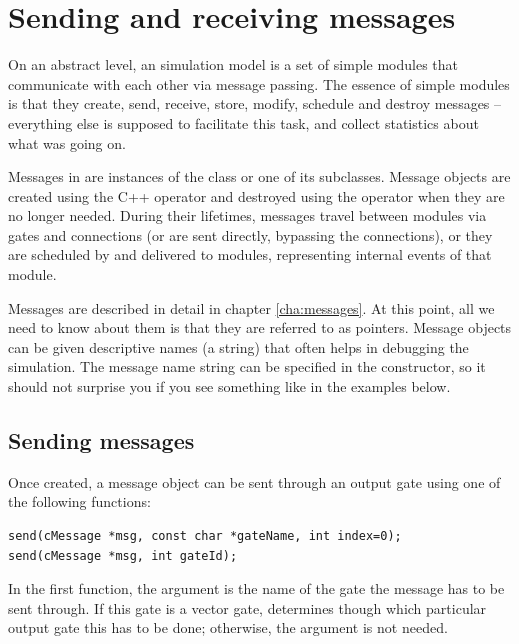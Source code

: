 \section{Sending and receiving messages}
\label{ch:simple-modules:sending-and-receiving}

On an abstract level, an {\opp} simulation model is a set of
simple modules that communicate with each other via message passing.
The essence of simple modules is that they create, send, receive,
store, modify, schedule and destroy messages -- everything else
is supposed to facilitate this task, and collect statistics
about what was going on.

Messages in {\opp} are instances of the  class or
one of its subclasses. Message objects are created using the C++
 operator and destroyed using the  operator
when they are no longer needed. During their lifetimes,
messages travel between modules via gates and connections
(or are sent directly, bypassing the connections), or
they are scheduled by and delivered to modules,
representing internal events of that module.

Messages are described in detail in chapter \ref{cha:messages}.
At this point, all we need to know about them is that they are
referred to as  pointers. Message objects
can be given descriptive names (a  string)
that often helps in debugging the simulation. The message
name string can be specified in the constructor, so it
should not surprise you if you see something like
 in the examples below.



\subsection{Sending messages}

Once created, a message object can be sent through an
output gate using one of the following functions:

\begin{verbatim}
send(cMessage *msg, const char *gateName, int index=0);
send(cMessage *msg, int gateId);
\end{verbatim}

In the first function, the argument  is the name of
the gate the message has to be sent through. If this gate is
a vector gate,  determines though which particular output
gate this has to be done; otherwise, the  argument is not
needed.

